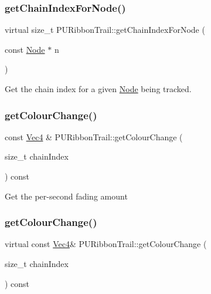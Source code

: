 \subsubsection{\texorpdfstring{get\+Chain\+Index\+For\+Node()}{getChainIndexForNode()}\hspace{0.1cm}{\footnotesize\ttfamily [2/2]}}
{\footnotesize\ttfamily virtual size\+\_\+t P\+U\+Ribbon\+Trail\+::get\+Chain\+Index\+For\+Node (\begin{DoxyParamCaption}\item[{const \hyperlink{classNode}{Node} $\ast$}]{n }\end{DoxyParamCaption})\hspace{0.3cm}{\ttfamily [virtual]}}

Get the chain index for a given \hyperlink{classNode}{Node} being tracked. \mbox{\label{classPURibbonTrail_acb288780202f2382d949f80be32b02ab}} 
\subsubsection{\texorpdfstring{get\+Colour\+Change()}{getColourChange()}\hspace{0.1cm}{\footnotesize\ttfamily [1/2]}}
{\footnotesize\ttfamily const \hyperlink{classVec4}{Vec4} \& P\+U\+Ribbon\+Trail\+::get\+Colour\+Change (\begin{DoxyParamCaption}\item[{size\+\_\+t}]{chain\+Index }\end{DoxyParamCaption}) const\hspace{0.3cm}{\ttfamily [virtual]}}

Get the per-\/second fading amount \mbox{\label{classPURibbonTrail_ab556e5f1f6d0d7fd4e128c1eef5060b6}} 
\subsubsection{\texorpdfstring{get\+Colour\+Change()}{getColourChange()}\hspace{0.1cm}{\footnotesize\ttfamily [2/2]}}
{\footnotesize\ttfamily virtual const \hyperlink{classVec4}{Vec4}\& P\+U\+Ribbon\+Trail\+::get\+Colour\+Change (\begin{DoxyParamCaption}\item[{size\+\_\+t}]{chain\+Index }\end{DoxyParamCaption}) const\hspace{0.3cm}{\ttfamily [virtual]}}

